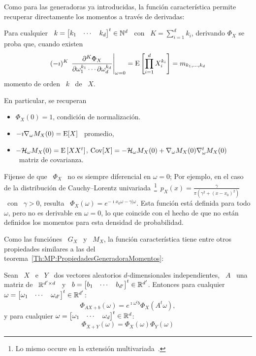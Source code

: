 Como para las generadoras ya introducidas, la funci\'on caracter\'istica permite
recuperar directamente los momentos a trav\'es de derivadas:
%
\begin{lema}
  Para cualquier \  $k = \begin{bmatrix} k_1 & \cdots  & k_d \end{bmatrix}^t \in
  \mathbb{N}^d$ \  con \  $K =  \sum_{i=1}^d k_i$, derivando  $\Phi_X$ se  proba que,
  cuando existen
  \[
  (-   \imath)^K  \,   \left.\frac{\partial^K   \Phi_X}{\partial  \omega_1^{k_1}
      \cdots    \partial    \omega_d^{k_d}}\right|_{\omega=0}    =    \operatorname{E}\left[
    \prod_{i=1}^d X_i^{k_i} \right] = m_{k_1,\ldots,k_d}
  \]
  momento de orden \ $k$ \ de \ $X$.
\end{lema}
%
En particular, se recuperan
%
\begin{itemize}
\item $\Phi_X(0) = 1$, condici\'on de normalizaci\'on.
%
\item $- \imath \nabla_\omega M_X(0) = \operatorname{E}[X]$ \ promedio,
%
\item  $- \mathcal{H}_\omega  M_X(0) =  \operatorname{E}\left[ X  X^t \right]$,  \ie $\operatorname{Cov}[X]  = -
  \mathcal{H}_\omega M_X(0) + \nabla_\omega M_X(0) \nabla_\omega^t M_X(0)$ \ matriz de
  covarianza.
\end{itemize}

Fijense de  que \  $\Phi_X$ \  no es siempre  diferencial en  $\omega =  0$; Por
ejemplo,    en   el    caso    de   la    distribuci\'on   de    Cauchy--Lorentz
univariada~\footnote{Lo      mismo       occure      en      la      extensi\'on
  multivariada~\cite{SamTaq91}.}\ $p_X(x) =  \frac{\gamma}{\pi \left( \gamma^2 +
    (x-x_0)^2  \right)}$ \  con  \ $\gamma  >  0$, resulta  \ $\Phi_X(\omega)  =
e^{-\imath x_0  \omega -\gamma |\omega}  $. Esta funci\'on est\'a  definida para
todo $\omega$,  pero no es  derivable en  $\omega = 0$,  lo que coincide  con el
hecho  de  que  no  est\'an   definidos  los  momentos  para  esta  densidad  de
probabilidad.

Como las  funci\'ones \ $G_X$ \  y \ $M_X$, la  funci\'on caracter\'istica tiene
entre       otros       propiedades        similares       a       las       del
teorema~\ref{Th:MP:PropiedadesGeneradoraMomentos}:
%
\begin{teorema}%
\label{Th:MP:PropiedadesGeneradoraMomentos}
Sean \ $X$ \ e \ $Y$ \ dos vectores aleatorios $d$-dimensionales independientes,
\ $A$ \ una  matriz de \ $\mathbb{R}^{d' \times d}$ \ y \  $b = \begin{bmatrix} b_1 &
  \cdots  &  b_{d'} \end{bmatrix}^t  \in  \mathbb{R}^{d'}$.  Entonces para  cualquier
$\omega =  \begin{bmatrix} \omega_1 &  \cdots & \omega_{d'}  \end{bmatrix}^t \in
\mathbb{R}^{d'}$:
  \[
  \Phi_{A X + b}(\omega) =  e^{\imath \omega^t b} \Phi_X\left( A^t \omega \right),
  \]
  y  para cualquier $\omega  = \begin{bmatrix}  \omega_1 &  \cdots &  \omega_d \end{bmatrix}^t \in
  \mathbb{R}^d$:
  \[
  \Phi_{X+Y}(\omega) = \Phi_X(\omega) \Phi_Y(\omega)
  \]
\end{teorema}

